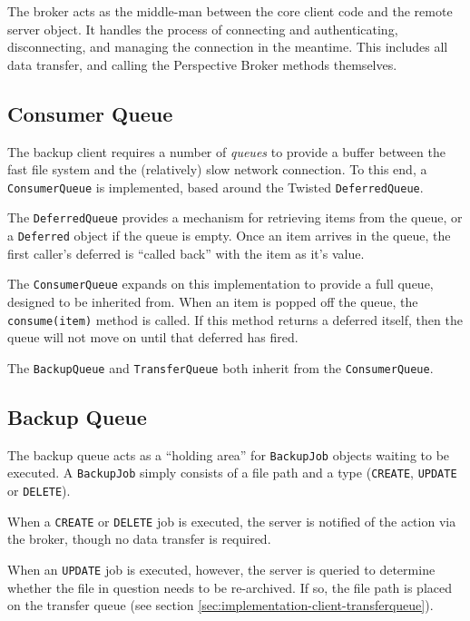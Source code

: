 The broker acts as the middle-man between the core client code and the remote
server object. It handles the process of connecting and authenticating,
disconnecting, and managing the connection in the meantime. This includes all
data transfer, and calling the Perspective Broker methods themselves.

\subsection{Consumer Queue}
\label{sec:implementation-client-consumerqueue}

The backup client requires a number of \emph{queues} to provide a buffer
between the fast file system and the (relatively) slow network connection. To
this end, a \verb!ConsumerQueue! is implemented, based around the Twisted
\verb!DeferredQueue!.

The \verb!DeferredQueue! provides a mechanism for retrieving items from the
queue, or a \verb!Deferred! object if the queue is empty. Once an item arrives
in the queue, the first caller's deferred is ``called back'' with the item as
it's value.

The \verb!ConsumerQueue! expands on this implementation to provide a full
queue, designed to be inherited from. When an item is popped off the queue, the
\verb!consume(item)! method is called. If this method returns a deferred
itself, then the queue will not move on until that deferred has fired.

The \verb!BackupQueue! and \verb!TransferQueue! both inherit from the
\verb!ConsumerQueue!.

\subsection{Backup Queue}
\label{sec:implementation-client-backupqueue}

The backup queue acts as a ``holding area'' for \verb!BackupJob! objects
waiting to be executed. A \verb!BackupJob! simply consists of a file path and
a type (\verb!CREATE!, \verb!UPDATE! or \verb!DELETE!).

When a \verb!CREATE! or \verb!DELETE! job is executed, the server is notified
of the action via the broker, though no data transfer is required.

When an \verb!UPDATE! job is executed, however, the server is queried to
determine whether the file in question needs to be re-archived. If so, the file
path is placed on the transfer queue (see section
\ref{sec:implementation-client-transferqueue}).

